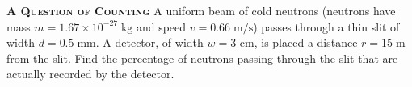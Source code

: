 \begin{problem}
{\textbf{\textsc{A Question of Counting}}} A uniform beam of cold neutrons (neutrons have mass $m=1.67\times {10}^{-27}\;\mathrm{kg}$ and speed $v=0.66\;\mathrm{m/s}$) passes through a thin slit of width $d=0.5\;\mathrm{mm}$. A detector, of width $w=3$ cm, is placed a distance $r=15\;\mathrm{m}$ from the slit. Find the percentage of neutrons passing through the slit that are actually recorded by the detector.
\end{problem}